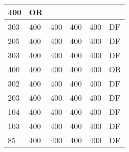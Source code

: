 \begin{table}[]
\begin{tabular}{lllll|l|}
400                                & OR                                    \\ \hline
303                                 & 400                                & 400                                & 400                                & 
400                                & DF                                    \\ \hline
205                                 & 400                                & 400                                & 400                                & 
400                                & DF                                    \\ \hline
303                                 & 400                                & 400                                & 400                                & 
400                                & DF                                    \\ \hline
400                                 & 400                                & 400                                & 400                                & 
400                                & OR                                    \\ \hline
302                                 & 400                                & 400                                & 400                                & 
400                                & DF                                    \\ \hline
203                                 & 400                                & 400                                & 400                                & 
400                                & DF                                    \\ \hline
104                                 & 400                                & 400                                & 400                                & 
400                                & DF                                    \\ \hline
103                                 & 400                                & 400                                & 400                                & 
400                                & DF                                    \\ \hline
85                                  & 400                                & 400                                & 400                                & 
400                                & DF                                    \\ \hline

\end{tabular}
\end{table}
